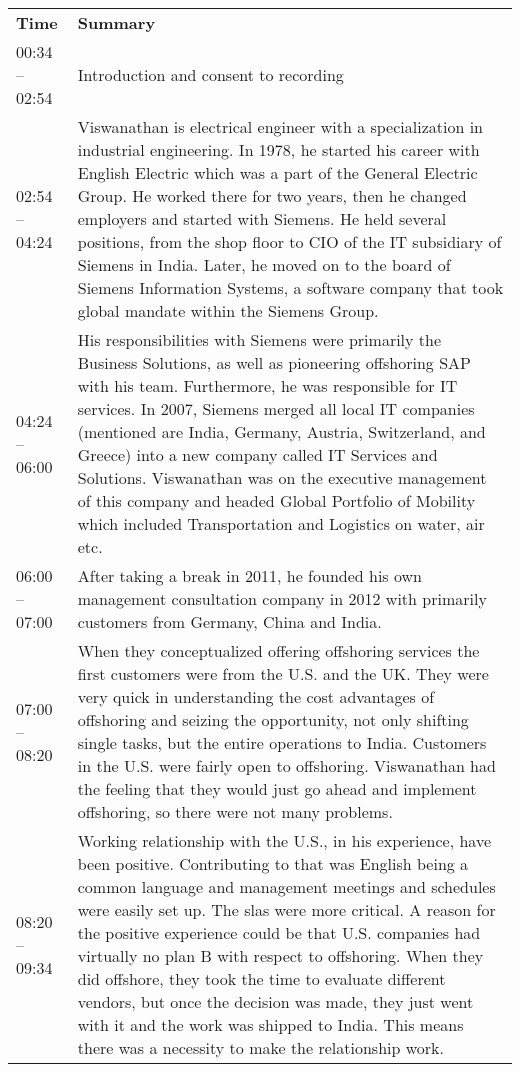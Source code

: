 \begin{appendix}
\begin{longtable}{l p{12.5cm}}
	\textbf{Time} & \textbf{Summary} \\ 
	00:34 -- 02:54 & Introduction and consent to recording\\
	02:54 -- 04:24& Viswanathan is electrical engineer with a specialization in industrial engineering. In 1978, he started his career with English Electric which was a part of the General Electric Group. He worked there for two years, then he changed employers and started with Siemens. He held several positions, from the shop floor to CIO of the IT subsidiary of Siemens in India. Later, he moved on to the board of Siemens Information Systems, a software company that took global mandate within the Siemens Group.\\
	04:24 -- 06:00 & His responsibilities with Siemens were primarily the Business Solutions, as well as pioneering offshoring SAP with his team. Furthermore, he was responsible for IT services. In 2007, Siemens merged all local IT companies (mentioned are India, Germany, Austria, Switzerland, and Greece) into a new company called IT Services and Solutions. Viswanathan was on the executive management of this company and headed Global Portfolio of Mobility which included Transportation and Logistics on water, air etc.\\
	06:00 -- 07:00 & After taking a break in 2011, he founded his own management consultation company in 2012 with primarily customers from Germany, China and India.\\
	07:00 -- 08:20&When they conceptualized offering offshoring services the first customers were from the U.S. and the UK. They were very quick in understanding the cost advantages of offshoring and seizing the opportunity, not only shifting single tasks, but the entire operations to India. Customers in the U.S. were fairly open to offshoring. Viswanathan had the feeling that they would just go ahead and implement offshoring, so there were not many problems.\\
	08:20 -- 09:34&Working relationship with the U.S., in his experience, have been positive. Contributing to that was English being a common language and management meetings and schedules were easily set up. The \glspl{sla} were more critical. A reason for the positive experience could be that U.S. companies had virtually no plan B with respect to offshoring. When they did offshore, they took the time to evaluate different vendors, but once the decision was made, they just went with it and the work was shipped to India. This means there was a necessity to make the relationship work.\\

\end{longtable}
\end{appendix}
